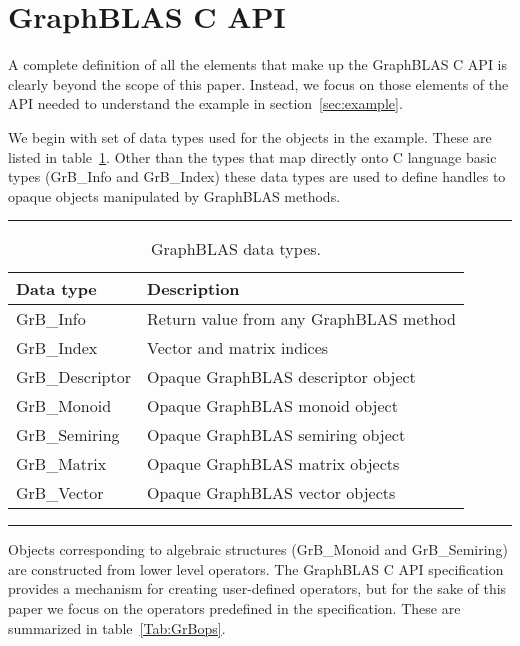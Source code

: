 \section{GraphBLAS C API}
\label{sec:Capi}

A complete definition of all the elements that make up the GraphBLAS C API
is clearly beyond the scope of this paper.  Instead, we focus on those
elements of the API needed to understand the example in section~\ref{sec:example}. 

We begin with set of data types used for the objects in the example.
These are listed in table~\ref{Tab:GrBdataTypes}.  Other than the types that map directly onto
C language basic types ({\sf GrB\_Info} and {GrB\_Index}) these data types
are used to define handles to opaque objects manipulated by GraphBLAS methods.
\begin{table}[h]
\hrule
\begin{center}
\caption{GraphBLAS data types.}
\label{Tab:GrBdataTypes}
\begin{tabular}{lp{5.25cm}}
Data type                         & Description  \\
\hline
	{\sf GrB\_Info}           & Return value from any GraphBLAS method \\
	{\sf GrB\_Index}          & Vector and matrix indices \\
	{\sf GrB\_Descriptor}     & Opaque GraphBLAS descriptor object \\
	{\sf GrB\_Monoid}         & Opaque GraphBLAS monoid object  \\
	{\sf GrB\_Semiring}       & Opaque GraphBLAS semiring object  \\
	{\sf GrB\_Matrix}         & Opaque GraphBLAS matrix objects \\
	{\sf GrB\_Vector}         & Opaque GraphBLAS vector objects \\
\end{tabular}
\end{center}
\hrule
\end{table}
Objects corresponding to algebraic structures ({\sf GrB\_Monoid} and {\sf GrB\_Semiring}) are constructed from lower level
operators. The GraphBLAS C API specification provides a mechanism for creating user-defined operators, but for the 
sake of this paper we focus on the operators predefined in the specification.  These are summarized
in table~\ref{Tab:GrBops}. 
